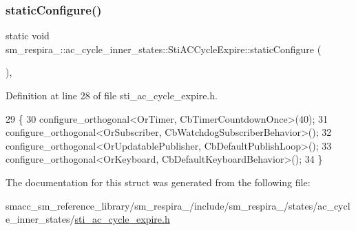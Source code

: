 \subsubsection{\texorpdfstring{static\+Configure()}{staticConfigure()}}
{\footnotesize\ttfamily static void sm\+\_\+respira\+\_\+::ac\+\_\+cycle\+\_\+inner\+\_\+states\+::\+Sti\+A\+C\+Cycle\+Expire\+::static\+Configure (\begin{DoxyParamCaption}{ }\end{DoxyParamCaption})\hspace{0.3cm}{\ttfamily [inline]}, {\ttfamily [static]}}



Definition at line 28 of file sti\+\_\+ac\+\_\+cycle\+\_\+expire.\+h.


\begin{DoxyCode}
29   \{
30     configure\_orthogonal<OrTimer, CbTimerCountdownOnce>(40);
31     configure\_orthogonal<OrSubscriber, CbWatchdogSubscriberBehavior>();
32     configure\_orthogonal<OrUpdatablePublisher, CbDefaultPublishLoop>();
33     configure\_orthogonal<OrKeyboard, CbDefaultKeyboardBehavior>();
34   \}
\end{DoxyCode}


The documentation for this struct was generated from the following file\+:\begin{DoxyCompactItemize}
\item 
smacc\+\_\+sm\+\_\+reference\+\_\+library/sm\+\_\+respira\+\_/include/sm\+\_\+respira\+\_/states/ac\+\_\+cycle\+\_\+inner\+\_\+states/\hyperlink{sti__ac__cycle__expire_8h}{sti\+\_\+ac\+\_\+cycle\+\_\+expire.\+h}\end{DoxyCompactItemize}
